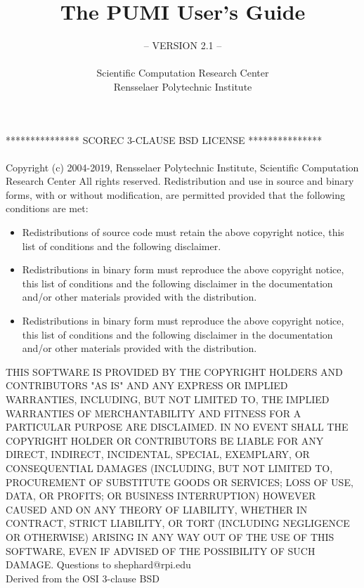 \documentclass[11pt]{article}  %
\author{}
\title{}
\title{The PUMI User's Guide}
\author{-- VERSION 2.1 --\\
\\
Scientific Computation Research Center \\
Rensselaer Polytechnic Institute}
\begin{document}
\maketitle


\newpage

\newpage
***************     SCOREC 3-CLAUSE BSD LICENSE     ***************
\\
\\
Copyright (c) 2004-2019, Rensselaer Polytechnic Institute, Scientific Computation Research Center
All rights reserved.
\newline
\newline
Redistribution and use in source and binary forms, with or without
modification, are permitted provided that the following conditions are met:

\begin{itemize}
\item Redistributions of source code must retain the above copyright notice,
  this list of conditions and the following disclaimer.

\item Redistributions in binary form must reproduce the above copyright notice,
  this list of conditions and the following disclaimer in the documentation
  and/or other materials provided with the distribution.

\item Redistributions in binary form must reproduce the above copyright notice,
  this list of conditions and the following disclaimer in the documentation
  and/or other materials provided with the distribution.
\end{itemize}

THIS SOFTWARE IS PROVIDED BY THE COPYRIGHT HOLDERS AND CONTRIBUTORS "AS IS"
AND ANY EXPRESS OR IMPLIED WARRANTIES, INCLUDING, BUT NOT LIMITED TO, THE
IMPLIED WARRANTIES OF MERCHANTABILITY AND FITNESS FOR A PARTICULAR PURPOSE ARE
DISCLAIMED. IN NO EVENT SHALL THE COPYRIGHT HOLDER OR CONTRIBUTORS BE LIABLE
FOR ANY DIRECT, INDIRECT, INCIDENTAL, SPECIAL, EXEMPLARY, OR CONSEQUENTIAL
DAMAGES (INCLUDING, BUT NOT LIMITED TO, PROCUREMENT OF SUBSTITUTE GOODS OR
SERVICES; LOSS OF USE, DATA, OR PROFITS; OR BUSINESS INTERRUPTION) HOWEVER
CAUSED AND ON ANY THEORY OF LIABILITY, WHETHER IN CONTRACT, STRICT LIABILITY,
OR TORT (INCLUDING NEGLIGENCE OR OTHERWISE) ARISING IN ANY WAY OUT OF THE USE
OF THIS SOFTWARE, EVEN IF ADVISED OF THE POSSIBILITY OF SUCH DAMAGE.
\newline
\newline
Questions to shephard@rpi.edu\\
Derived from the OSI 3-clause BSD
\newpage
\newpage

\tableofcontents
\newpage





%













%
%
%
\end{document}
